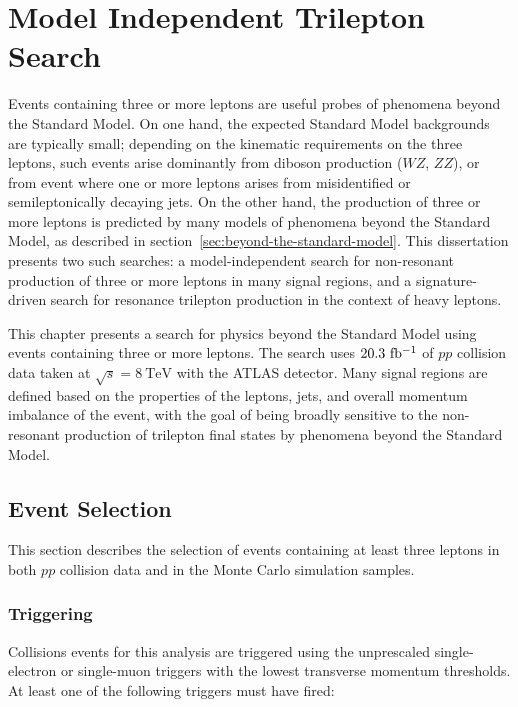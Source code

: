 \chapter{Model Independent Trilepton Search}\label{ch:model-independent-trilepton-search}

Events containing three or more leptons are useful probes of phenomena beyond the Standard Model. On one hand, the expected Standard Model backgrounds are typically small; depending on the kinematic requirements on the three leptons, such events arise dominantly from diboson production ($WZ$, $ZZ$), or from event where one or more leptons arises from misidentified or semileptonically decaying jets. On the other hand, the production of three or more leptons is predicted by many models of phenomena beyond the Standard Model, as described in section~\ref{sec:beyond-the-standard-model}. This dissertation presents two such searches: a model-independent search for non-resonant production of three or more leptons in many signal regions, and a signature-driven search for resonance trilepton production in the context of heavy leptons. 

This chapter presents a search for physics beyond the Standard Model using events containing three or more leptons. The search uses $20.3~\mbox{fb$^{-1}$}$ of $pp$ collision data taken at $\sqrt{s}=8~\mbox{TeV}$ with the ATLAS detector. Many signal regions are defined based on the properties of the leptons, jets, and overall momentum imbalance of the event, with the goal of being broadly sensitive to the non-resonant production of trilepton final states by phenomena beyond the Standard Model. 

\section{Event Selection}\label{sec:model-independent-event-selection}

This section describes the selection of events containing at least three leptons in both $pp$ collision data and in the Monte Carlo simulation samples. 

\subsection{Triggering}
Collisions events for this analysis are triggered using the unprescaled single-electron or single-muon triggers with the lowest transverse momentum thresholds. At least one of the following triggers must have fired:

